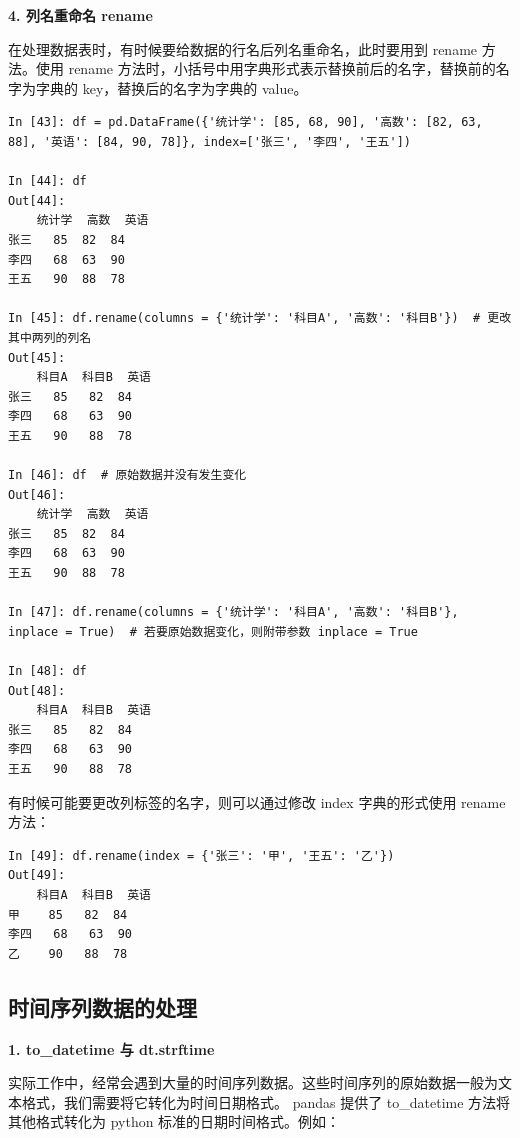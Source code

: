 \vspace{3pt}
\noindent\textbf{4. 列名重命名 rename}
\vspace{3pt}

在处理数据表时，有时候要给数据的行名后列名重命名，此时要用到 rename 方法。使用 rename 方法时，小括号中用字典形式表示替换前后的名字，替换前的名字为字典的 key，替换后的名字为字典的 value。

\begin{lstlisting}[Language=Python]
In [43]: df = pd.DataFrame({'统计学': [85, 68, 90], '高数': [82, 63, 88], '英语': [84, 90, 78]}, index=['张三', '李四', '王五'])

In [44]: df
Out[44]:
    统计学  高数  英语
张三   85  82  84
李四   68  63  90
王五   90  88  78

In [45]: df.rename(columns = {'统计学': '科目A', '高数': '科目B'})  # 更改其中两列的列名
Out[45]:
    科目A  科目B  英语
张三   85   82  84
李四   68   63  90
王五   90   88  78

In [46]: df  # 原始数据并没有发生变化
Out[46]:
    统计学  高数  英语
张三   85  82  84
李四   68  63  90
王五   90  88  78

In [47]: df.rename(columns = {'统计学': '科目A', '高数': '科目B'}, inplace = True)  # 若要原始数据变化，则附带参数 inplace = True

In [48]: df
Out[48]:
    科目A  科目B  英语
张三   85   82  84
李四   68   63  90
王五   90   88  78
\end{lstlisting}

有时候可能要更改列标签的名字，则可以通过修改 index 字典的形式使用 rename 方法：

\begin{lstlisting}[Language=Python]
In [49]: df.rename(index = {'张三': '甲', '王五': '乙'})
Out[49]:
    科目A  科目B  英语
甲    85   82  84
李四   68   63  90
乙    90   88  78
\end{lstlisting}



\subsection{时间序列数据的处理}

\vspace{3pt}
\noindent\textbf{1. to\_datetime 与 dt.strftime}
\vspace{3pt}

实际工作中，经常会遇到大量的时间序列数据。这些时间序列的原始数据一般为文本格式，我们需要将它转化为时间日期格式。 pandas 提供了 to\_datetime 方法将其他格式转化为 python 标准的日期时间格式。例如：

